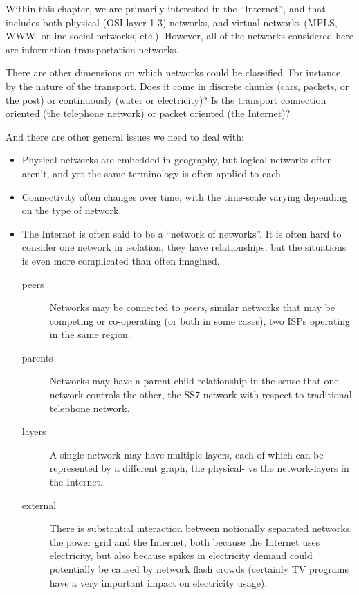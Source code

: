 Within this chapter, we are primarily interested in the ``Internet'',
and that includes both physical (OSI layer 1-3) networks, and virtual
networks (MPLS, WWW, online social networks, etc.). However, all of
the networks considered here are information transportation networks.

There are other dimensions on which networks could be classified. For
instance, by the nature of the transport. Does it come in discrete
chunks (\eg cars, packets, or the post) or continuously (\eg water or
electricity)? Is the transport connection oriented (\eg the telephone
network) or packet oriented (\eg the Internet)?

And there are other general issues we need to deal with:
\begin{itemize}

  \item Physical networks are embedded in geography, but logical
    networks often aren't, and yet the same terminology is often
    applied to each.

  \item Connectivity often changes over time, with the time-scale
    varying depending on the type of network.

  \item The Internet is often said to be a ``network of networks''. It
    is often hard to consider one network in isolation, they have
    relationships, but the situations is even more complicated than
    often imagined.
    \begin{description}

    \item[peers] Networks may be connected to {\em peers}, \ie similar
      networks that may be competing or co-operating (or both in some
      cases), \eg two ISPs operating in the same region.

    \item[parents] Networks may have a parent-child relationship in
      the sense that one network controls the other, \eg the SS7
      network with respect to traditional telephone network.

    \item[layers] A single network may have multiple layers, each of
      which can be represented by a different graph, \eg the physical-
      vs the network-layers in the Internet.

    \item[external] There is substantial interaction between
      notionally separated networks, \eg the power grid and the
      Internet, both because the Internet uses electricity, but also
      because spikes in electricity demand could potentially be caused
      by network flash crowds (certainly TV programs have a very
      important impact on electricity usage).

    \end{description}
    
\end{itemize}

